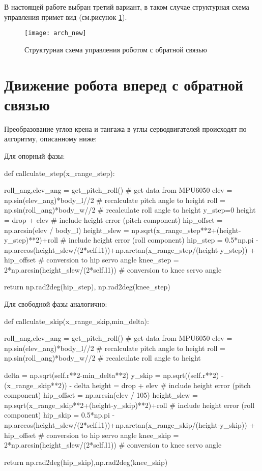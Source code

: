 \noindent В настоящей работе выбран третий вариант, в таком случае структурная схема управления примет вид (см.рисунок \ref{arch_new}).
\newpage
\begin{figure}[h!]
	\begin{center}
		\texttt{[image: arch\_new]}
		\caption{Структурная схема управления роботом с обратной связью}
		\label{arch_new}
	\end{center}
\end{figure}
\newpage
\section{Движение робота вперед с обратной связью}\label{C5_3}

Преобразование углов крена и тангажа в углы серводвигателей происходят по алгоритму, описанному ниже:

Для опорный фазы:
\begin{python}
	
    def callculate_step(x_range_step):

		roll_ang,elev_ang = get_pitch_roll() # get data from MPU6050
		elev = np.sin(elev_ang)*body_l//2 # recalculate pitch angle to height
		roll = np.sin(roll_ang)*body_w//2 # recalculate roll angle to height
		y_step=0
		height = drop + elev # include height error (pitch component)
		hip_offset = np.arcsin(elev / body_l) 
		height_slew = np.sqrt(x_range_step**2+(height-y_step)**2)+roll # include height error (roll component) 
		hip_step = 0.5*np.pi - np.arccos(height_slew/(2*self.l1))+np.arctan(x_range_step/(height-y_step)) + hip_offset # conversion to hip servo angle
		knee_step = 2*np.arcsin(height_slew/(2*self.l1)) # conversion to knee servo angle
	
	return np.rad2deg(hip_step), np.rad2deg(knee_step)	
\end{python}

Для свободной фазы аналогично:
\begin{python}
	
    def callculate_skip(x_range_skip,min_delta):
    
		roll_ang,elev_ang = get_pitch_roll() # get data from MPU6050
		elev = np.sin(elev_ang)*body_l//2 # recalculate pitch angle to height
		roll = np.sin(roll_ang)*body_w//2 # recalculate roll angle to height
			
		delta = np.sqrt(self.r**2-min_delta**2)
		y_skip = np.sqrt((self.r**2) - (x_range_skip**2)) - delta
		height = drop + elev # include height error (pitch component)
		hip_offset = np.arcsin(elev / 105)
		height_slew = np.sqrt(x_range_skip**2+(height-y_skip)**2)+roll # include height error (roll component)
		hip_skip = 0.5*np.pi - np.arccos(height_slew/(2*self.l1))+np.arctan(x_range_skip/(height-y_skip)) + hip_offset # conversion to hip servo angle
		knee_skip = 2*np.arcsin(height_slew/(2*self.l1)) # conversion to knee servo angle

	return np.rad2deg(hip_skip),np.rad2deg(knee_skip)
	
\end{python}

